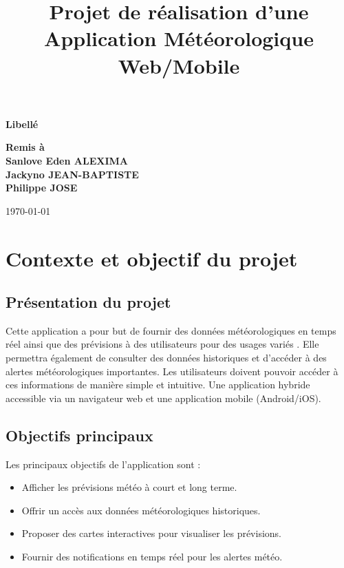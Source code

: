 \documentclass[a4paper,12pt]{article}
\title{Projet de réalisation d'une Application Météorologique Web/Mobile }
\author{}
\date{}
\begin{document}
\maketitle

\vfill %
\begin{center}
    \Huge \textbf{Libellé} %
\end{center}
\vfill %

\begin{center}
    \textbf{Remis à} \\[1em] %
    \textbf{Sanlove Eden ALEXIMA} \\
    \textbf{Jackyno JEAN-BAPTISTE} \\
    \textbf{Philippe JOSE}
\end{center}

	
\begin{center}
    \today
\end{center}


\clearpage %

\tableofcontents %
\newpage %

\section{Contexte et objectif du projet}
\subsection{Présentation du projet}
Cette application a pour but de fournir des données météorologiques en temps réel ainsi que des prévisions à des utilisateurs pour des usages variés . 
Elle permettra également de consulter des données historiques et d'accéder à des alertes météorologiques importantes. Les utilisateurs doivent pouvoir accéder à ces informations de manière simple et intuitive. Une application hybride accessible via un navigateur web et une application mobile (Android/iOS).

\subsection{Objectifs principaux}
Les principaux objectifs de l'application sont :
\begin{itemize}
    \item Afficher les prévisions météo à court et long terme.
    \item Offrir un accès aux données météorologiques historiques.
    \item Proposer des cartes interactives pour visualiser les prévisions.
    \item Fournir des notifications en temps réel pour les alertes météo.
\end{itemize}
\end{document}
